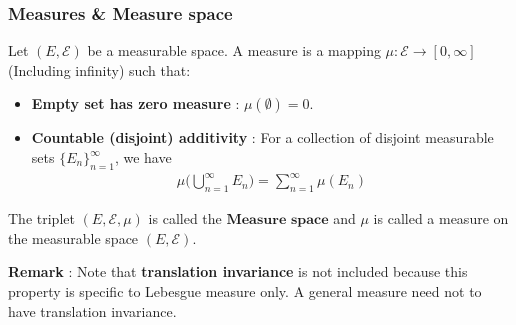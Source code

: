 \subsubsection{Measures \& Measure space}
\begin{definition}
    Let $(E, \mathcal{E})$ be a measurable space. A measure is a mapping $\mu:\mathcal{E}\to[0, \infty]$ (Including infinity) such that:
    \begin{itemize}
        \item \textbf{Empty set has zero measure} : $\mu(\emptyset) = 0$.
        \item \textbf{Countable (disjoint) additivity} : For a collection of disjoint measurable sets $\{E_n\}_{n=1}^\infty$, we have
        \begin{align*}
            \mu\Bigg( \bigcup_{n=1}^\infty E_n \Bigg) = \sum_{n=1}^\infty \mu(E_n)
        \end{align*}
    \end{itemize}

    \noindent The triplet $(E, \mathcal{E}, \mu)$ is called the $\textbf{Measure space}$ and $\mu$ is called a measure on the measurable space $(E, \mathcal{E})$.
\end{definition}

\noindent\newline \textbf{Remark} : Note that \textbf{translation invariance} is not included because this property is specific to Lebesgue measure only. A general measure need not to have translation invariance.  

